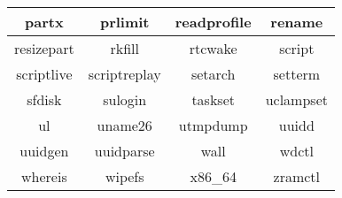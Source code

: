 \begin{itemize}
\begin{center}
\begin{tabular}{|c|c|c|c|}
                \hline
                partx & prlimit & readprofile & rename \\
                \hline
                resizepart & rkfill & rtcwake & script \\
                \hline
                scriptlive & scriptreplay & setarch & setterm \\
                \hline
                sfdisk & sulogin & taskset & uclampset \\
                \hline
                ul & uname26 & utmpdump & uuidd \\
                \hline
                uuidgen & uuidparse & wall & wdctl \\
                \hline
                whereis & wipefs & x86\_64 & zramctl \\
                \hline
            \end{tabular}
        \end{center}
\end{itemize}